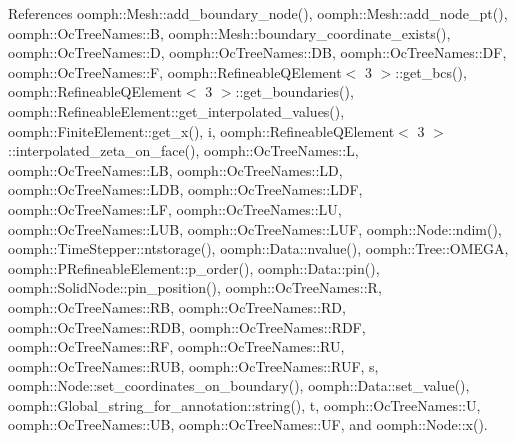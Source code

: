 References oomph\+::\+Mesh\+::add\+\_\+boundary\+\_\+node(), oomph\+::\+Mesh\+::add\+\_\+node\+\_\+pt(), oomph\+::\+Oc\+Tree\+Names\+::B, oomph\+::\+Mesh\+::boundary\+\_\+coordinate\+\_\+exists(), oomph\+::\+Oc\+Tree\+Names\+::D, oomph\+::\+Oc\+Tree\+Names\+::\+DB, oomph\+::\+Oc\+Tree\+Names\+::\+DF, oomph\+::\+Oc\+Tree\+Names\+::F, oomph\+::\+Refineable\+Q\+Element$<$ 3 $>$\+::get\+\_\+bcs(), oomph\+::\+Refineable\+Q\+Element$<$ 3 $>$\+::get\+\_\+boundaries(), oomph\+::\+Refineable\+Element\+::get\+\_\+interpolated\+\_\+values(), oomph\+::\+Finite\+Element\+::get\+\_\+x(), i, oomph\+::\+Refineable\+Q\+Element$<$ 3 $>$\+::interpolated\+\_\+zeta\+\_\+on\+\_\+face(), oomph\+::\+Oc\+Tree\+Names\+::L, oomph\+::\+Oc\+Tree\+Names\+::\+LB, oomph\+::\+Oc\+Tree\+Names\+::\+LD, oomph\+::\+Oc\+Tree\+Names\+::\+L\+DB, oomph\+::\+Oc\+Tree\+Names\+::\+L\+DF, oomph\+::\+Oc\+Tree\+Names\+::\+LF, oomph\+::\+Oc\+Tree\+Names\+::\+LU, oomph\+::\+Oc\+Tree\+Names\+::\+L\+UB, oomph\+::\+Oc\+Tree\+Names\+::\+L\+UF, oomph\+::\+Node\+::ndim(), oomph\+::\+Time\+Stepper\+::ntstorage(), oomph\+::\+Data\+::nvalue(), oomph\+::\+Tree\+::\+O\+M\+E\+GA, oomph\+::\+P\+Refineable\+Element\+::p\+\_\+order(), oomph\+::\+Data\+::pin(), oomph\+::\+Solid\+Node\+::pin\+\_\+position(), oomph\+::\+Oc\+Tree\+Names\+::R, oomph\+::\+Oc\+Tree\+Names\+::\+RB, oomph\+::\+Oc\+Tree\+Names\+::\+RD, oomph\+::\+Oc\+Tree\+Names\+::\+R\+DB, oomph\+::\+Oc\+Tree\+Names\+::\+R\+DF, oomph\+::\+Oc\+Tree\+Names\+::\+RF, oomph\+::\+Oc\+Tree\+Names\+::\+RU, oomph\+::\+Oc\+Tree\+Names\+::\+R\+UB, oomph\+::\+Oc\+Tree\+Names\+::\+R\+UF, s, oomph\+::\+Node\+::set\+\_\+coordinates\+\_\+on\+\_\+boundary(), oomph\+::\+Data\+::set\+\_\+value(), oomph\+::\+Global\+\_\+string\+\_\+for\+\_\+annotation\+::string(), t, oomph\+::\+Oc\+Tree\+Names\+::U, oomph\+::\+Oc\+Tree\+Names\+::\+UB, oomph\+::\+Oc\+Tree\+Names\+::\+UF, and oomph\+::\+Node\+::x().

\mbox{\label{classoomph_1_1PRefineableQElement_3_013_00_01INITIAL__NNODE__1D_01_4_a834f8845f48fbfe51d1ad0e7b061af44}} 
